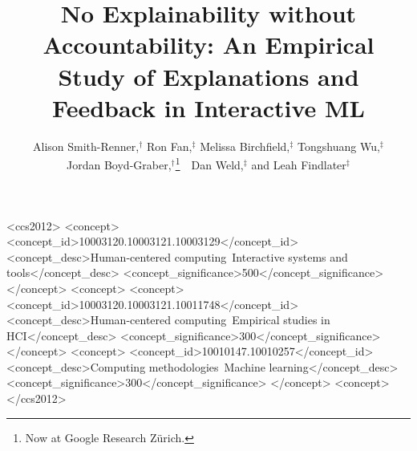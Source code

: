 \documentclass{style/sigchi}
\def\plaintitle{No Explainability without Accountability: An Empirical Study of Explanations and Feedback in Interactive ML}
\begin{document}
\title{\plaintitle}



\author{%
Alison Smith-Renner,$^\dag$ Ron Fan,$^\ddag$ Melissa Birchfield,$^\ddag$ Tongshuang Wu,$^\ddag$ \\
Jordan Boyd-Graber,$^\dag$\thanks{Now at
Google Research Z\"urich.}~~Dan Weld,$^\ddag$ and Leah Findlater$^\ddag$
}


\maketitle

\begin{abstract}

\end{abstract}



\begin{CCSXML}
<ccs2012>
<concept>
<concept_id>10003120.10003121.10003129</concept_id>
<concept_desc>Human-centered computing~Interactive systems and tools</concept_desc>
<concept_significance>500</concept_significance>
</concept>
<concept>
<concept>
<concept_id>10003120.10003121.10011748</concept_id>
<concept_desc>Human-centered computing~Empirical studies in HCI</concept_desc>
<concept_significance>300</concept_significance>
</concept>
<concept>
<concept_id>10010147.10010257</concept_id>
<concept_desc>Computing methodologies~Machine learning</concept_desc>
<concept_significance>300</concept_significance>
</concept>
<concept>
</ccs2012>
\end{CCSXML}
\end{document}
